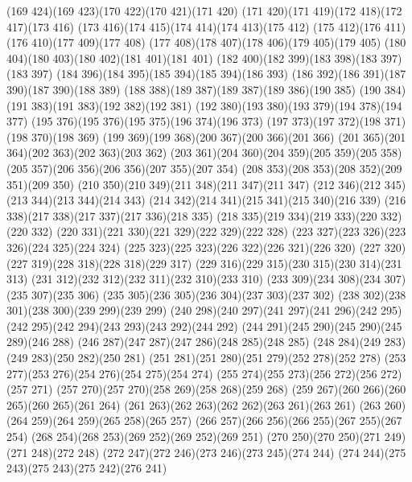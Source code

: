 \cpath (169 424)(169 423)(170 422)(170 421)(171 420)
\cpath (171 420)(171 419)(172 418)(172 417)(173 416)
\cpath (173 416)(174 415)(174 414)(174 413)(175 412)
\cpath (175 412)(176 411)(176 410)(177 409)(177 408)
\cpath (177 408)(178 407)(178 406)(179 405)(179 405)
\cpath (180 404)(180 403)(180 402)(181 401)(181 401)
\cpath (182 400)(182 399)(183 398)(183 397)(183 397)
\cpath (184 396)(184 395)(185 394)(185 394)(186 393)
\cpath (186 392)(186 391)(187 390)(187 390)(188 389)
\cpath (188 388)(189 387)(189 387)(189 386)(190 385)
\cpath (190 384)(191 383)(191 383)(192 382)(192 381)
\cpath (192 380)(193 380)(193 379)(194 378)(194 377)
\cpath (195 376)(195 376)(195 375)(196 374)(196 373)
\cpath (197 373)(197 372)(198 371)(198 370)(198 369)
\cpath (199 369)(199 368)(200 367)(200 366)(201 366)
\cpath (201 365)(201 364)(202 363)(202 363)(203 362)
\cpath (203 361)(204 360)(204 359)(205 359)(205 358)
\cpath (205 357)(206 356)(206 356)(207 355)(207 354)
\cpath (208 353)(208 353)(208 352)(209 351)(209 350)
\cpath (210 350)(210 349)(211 348)(211 347)(211 347)
\cpath (212 346)(212 345)(213 344)(213 344)(214 343)
\cpath (214 342)(214 341)(215 341)(215 340)(216 339)
\cpath (216 338)(217 338)(217 337)(217 336)(218 335)
\cpath (218 335)(219 334)(219 333)(220 332)(220 332)
\cpath (220 331)(221 330)(221 329)(222 329)(222 328)
\cpath (223 327)(223 326)(223 326)(224 325)(224 324)
\cpath (225 323)(225 323)(226 322)(226 321)(226 320)
\cpath (227 320)(227 319)(228 318)(228 318)(229 317)
\cpath (229 316)(229 315)(230 315)(230 314)(231 313)
\cpath (231 312)(232 312)(232 311)(232 310)(233 310)
\cpath (233 309)(234 308)(234 307)(235 307)(235 306)
\cpath (235 305)(236 305)(236 304)(237 303)(237 302)
\cpath (238 302)(238 301)(238 300)(239 299)(239 299)
\cpath (240 298)(240 297)(241 297)(241 296)(242 295)
\cpath (242 295)(242 294)(243 293)(243 292)(244 292)
\cpath (244 291)(245 290)(245 290)(245 289)(246 288)
\cpath (246 287)(247 287)(247 286)(248 285)(248 285)
\cpath (248 284)(249 283)(249 283)(250 282)(250 281)
\cpath (251 281)(251 280)(251 279)(252 278)(252 278)
\cpath (253 277)(253 276)(254 276)(254 275)(254 274)
\cpath (255 274)(255 273)(256 272)(256 272)(257 271)
\cpath (257 270)(257 270)(258 269)(258 268)(259 268)
\cpath (259 267)(260 266)(260 265)(260 265)(261 264)
\cpath (261 263)(262 263)(262 262)(263 261)(263 261)
\cpath (263 260)(264 259)(264 259)(265 258)(265 257)
\cpath (266 257)(266 256)(266 255)(267 255)(267 254)
\cpath (268 254)(268 253)(269 252)(269 252)(269 251)
\cpath (270 250)(270 250)(271 249)(271 248)(272 248)
\cpath (272 247)(272 246)(273 246)(273 245)(274 244)
\cpath (274 244)(275 243)(275 243)(275 242)(276 241)

